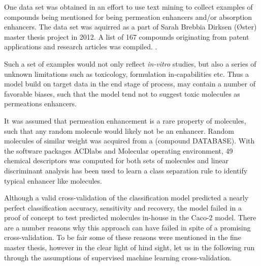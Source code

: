 One data set was obtained in an effort to use text mining to collect examples of compounds being mentioned for being permeation enhancers and/or absorption enhancers. The data set was aquirred as a part of Sarah Brebbia Dirksen (Øster) master thesis project in 2012. A list of 167 compounds originating from patent applications and research articles was compiled. \cite{sara2012application}.

Such a set of examples would not only reflect \textit{in-vitro} studies, but also a series of unknown limitations such as toxicology, formulation in-capabilities etc. Thus a model build on target data in the end stage of process, may contain a number of favorable biases, such that the model tend not to suggest toxic molecules as permeations enhancers.

It was assumed that permeation enhancement is a rare property of molecules, such that any random molecule would likely not be an enhancer. Random molecules of similar weight was acquired from a (compound DATABASE). With the software packages ACDlabs and Molecular operating environment, 49 chemical descriptors was computed for both sets of molecules and linear discriminant analysis has been used to learn a class separation rule to identify typical enhancer like molecules. \cite{sara2012application}

Although a valid cross-validation of the classification model predicted a nearly perfect classification accuracy, sensitivity and recovery, the model failed in a proof of concept to test predicted molecules in-house in the Caco-2 model. There are a number reasons why this approach can have failed in spite of a promising cross-validation. To be fair some of these reasons were mentioned in the fine master thesis, however in the clear light of hind sight, let us in the following run through the assumptions of supervised machine learning cross-validation.

